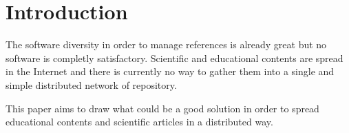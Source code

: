 \section{Introduction}

The software diversity in order to manage references is already
great but no software is completly satisfactory. Scientific and
educational contents are spread in the Internet and there is currently
no way to gather them into a single and simple distributed network of repository.

This paper aims to draw what could be a good solution in order to
spread educational contents and scientific articles in a distributed
way.
